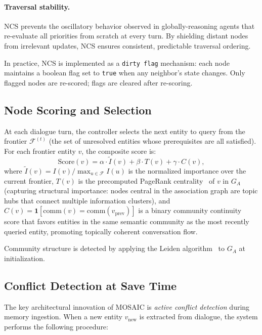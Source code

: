 \documentclass[10pt,twocolumn]{article}
\begin{document}
\paragraph{Traversal stability.}
NCS prevents the oscillatory behavior observed in globally-reasoning agents
that re-evaluate all priorities from scratch at every turn. By shielding
distant nodes from irrelevant updates, NCS ensures consistent, predictable
traversal ordering.

In practice, NCS is implemented as a \texttt{dirty flag} mechanism: each
node maintains a boolean flag set to \texttt{true} when any neighbor's state
changes. Only flagged nodes are re-scored; flags are cleared after re-scoring.

\subsection{Node Scoring and Selection}
\label{sec:scoring}

At each dialogue turn, the controller selects the next entity to query from
the frontier $\mathcal{F}^{(t)}$ (the set of unresolved entities whose
prerequisites are all satisfied). For each frontier entity $v$, the
composite score is:
\begin{equation}
  \mathrm{Score}(v) = \alpha \cdot \tilde{I}(v) + \beta \cdot T(v)
    + \gamma \cdot C(v),
  \label{eq:score}
\end{equation}
where $\tilde{I}(v) = I(v) / \max_{u \in \mathcal{F}} I(u)$ is the
normalized importance over the current frontier, $T(v)$ is the precomputed
PageRank centrality~\citep{page1999pagerank} of $v$ in $G_A$ (capturing
structural importance: nodes central in the association graph are topic hubs
that connect multiple information clusters), and
$C(v) = \mathbf{1}[\mathrm{comm}(v) = \mathrm{comm}(v_{\mathrm{prev}})]$ is
a binary community continuity score that favors entities in the same semantic
community as the most recently queried entity, promoting topically coherent
conversation flow.

Community structure is detected by applying the Leiden
algorithm~\citep{traag2019louvain} to $G_A$ at initialization.

\subsection{Conflict Detection at Save Time}
\label{sec:conflict_detection}

The key architectural innovation of MOSAIC is \emph{active conflict
detection} during memory ingestion. When a new entity $v_\text{new}$ is
extracted from dialogue, the system performs the following procedure:
\end{document}
